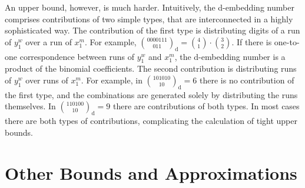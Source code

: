 \documentclass[journal, twocol]{IEEEtran}
\newcommand{\dlbinom}[2]{{\binom{#1}{#2}_{\!\text{d}}}}
\newcommand{\defeq}{{\overset{\triangle}{=}}}
\begin{document}
An upper bound, however, is much harder.
Intuitively, the d-embedding number comprises contributions of two simple types, that are interconnected in a highly sophisticated way.
The contribution of the first type is distributing digits of a run of $y_1^w$ over a run of $x_1^m$.
For example, $\binom{0000111}{011}_\text{d}=\binom{4}{1}\cdot\binom{3}{2}$.
If there is one-to-one correspondence between runs of $y_1^w$ and $x_1^m$, the d-embedding number is a product of the binomial coefficients.
The second contribution is distributing runs of $y_1^w$ over runs of $x_1^m$.
For example, in $\binom{101010}{10}_\text{d}=6$ there is no contribution of the first type, and the combinations are generated solely by distributing the runs themselves.
In $\binom{110100}{10}_\text{d}=9$ there are contributions of both types.
In most cases there are both types of contributions, complicating the calculation of tight upper bounds.



\section{Other Bounds and Approximations}
\label{s:other}
\end{document}
